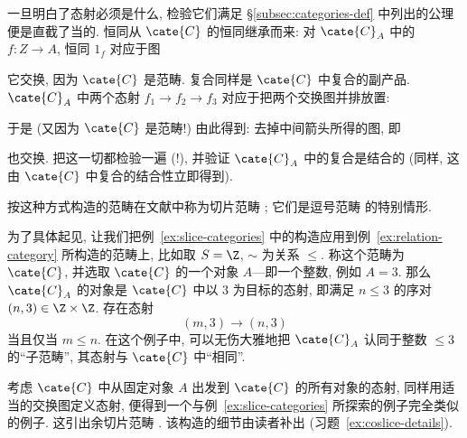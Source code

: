 \begin{example}
一旦明白了态射必须是什么, 检验它们满足 \S\ref{subsec:categories-def} 中列出的公理便是直截了当的. 恒同从 $\cate{C}$ 的恒同继承而来: 对 $\cate{C}_A$ 中的 $f : Z \to A$, 恒同 $1_f$ 对应于图
\begin{center}
\end{center}
它交换, 因为 $\cate{C}$ 是范畴. 复合同样是 $\cate{C}$ 中复合的副产品. $\cate{C}_A$ 中两个态射 $f_1 \to f_2 \to f_3$ 对应于把两个交换图并排放置:
\begin{center}
\end{center}
于是 (又因为 $\cate{C}$ 是范畴!) 由此得到: 去掉中间箭头所得的图, 即
\begin{center}
\end{center}
也交换. 把这一切都检验一遍 (!), 并验证 $\cate{C}_A$ 中的复合是结合的 (同样, 这由 $\cate{C}$ 中复合的结合性立即得到).

按这种方式构造的范畴在文献中称为切片范畴%
; 它们是逗号范畴%
的特别情形.
\end{example}

\begin{example}
\label{ex:slice-concrete}
为了具体起见, 让我们把例~\ref{ex:slice-categories} 中的构造应用到例~\ref{ex:relation-category} 所构造的范畴上, 比如取 $S = \Z$, $\sim$ 为关系 $\leq$. 称这个范畴为 $\cate{C}$, 并选取 $\cate{C}$ 的一个对象 $A$---即一个整数, 例如 $A = 3$. 那么 $\cate{C}_A$ 的对象是 $\cate{C}$ 中以 $3$ 为目标的态射, 即满足 $n \leq 3$ 的序对 $(n,3) \in \Z \times \Z$. 存在态射
\[
(m, 3) \to (n, 3)
\]
当且仅当 $m \leq n$. 在这个例子中, 可以无伤大雅地把 $\cate{C}_A$ 认同于整数 $\leq 3$ 的``子范畴'', 其态射与 $\cate{C}$ 中``相同''.
\end{example}

\begin{example}
\label{ex:coslice}
考虑 $\cate{C}$ 中从固定对象 $A$ 出发到 $\cate{C}$ 的所有对象的态射, 同样用适当的交换图定义态射, 便得到一个与例~\ref{ex:slice-categories} 所探索的例子完全类似的例子. 这引出余切片范畴%
. 该构造的细节由读者补出 (习题~\ref{ex:coslice-details}).
\end{example}

